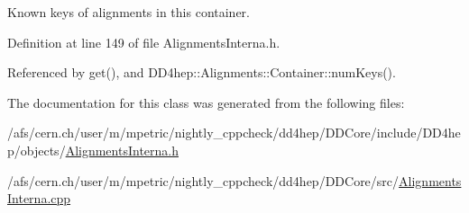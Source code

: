 Known keys of alignments in this container. 

Definition at line 149 of file AlignmentsInterna.h.

Referenced by get(), and DD4hep::Alignments::Container::numKeys().

The documentation for this class was generated from the following files:\begin{DoxyCompactItemize}
\item 
/afs/cern.ch/user/m/mpetric/nightly\_\-cppcheck/dd4hep/DDCore/include/DD4hep/objects/\hyperlink{_alignments_interna_8h}{AlignmentsInterna.h}\item 
/afs/cern.ch/user/m/mpetric/nightly\_\-cppcheck/dd4hep/DDCore/src/\hyperlink{_alignments_interna_8cpp}{AlignmentsInterna.cpp}\end{DoxyCompactItemize}
